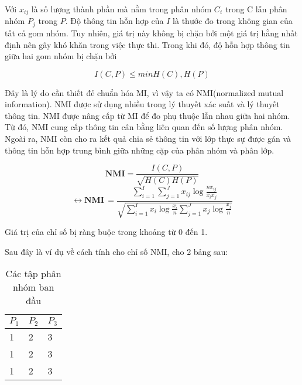 Với $x_{ij}$ là số lượng thành phần mà nằm trong phân nhóm $C_i$ trong C lẫn phân nhóm $P_j$ trong $P$.
Độ thông tin hỗn hợp của $I$ là thước đo trong không gian của tất cả gom nhóm.
Tuy nhiên, giá trị này không bị chặn bởi một giá trị hằng nhất định nên gây khó khăn trong việc thực thi. Trong khi đó, độ hỗn hợp thông tin giữa hai gom nhóm bị chặn bởi 
\begin{center}
\begin{equation}
I (C, P) \leq min{H(C), H(P)}
\end{equation}
\end{center}

Đây là lý do cần thiết đẻ chuẩn hóa MI, vì vậy ta có NMI(normalized mutual information).
NMI được sử dụng nhiều trong lý thuyết xác suất và lý thuyết thông tin.
NMI được nâng cấp từ MI để đo phụ thuộc lẫn nhau giữa hai nhóm.
Từ đó, NMI cung cấp thông tin cân bằng liên quan đến số lượng phân nhóm.
Ngoài ra, NMI còn cho ra kết quả chia sẻ thông tin với lớp thực sự được gán và thông tin hỗn hợp trung bình giữa những cặp của phân nhóm và phân lớp.
		
\begin{center}
\begin{equation}
\textbf{NMI} = \frac{I(C,P)}{\sqrt{H(C)H(P)}}
\end{equation}
\begin{equation} \label{eq:NMI}
\longleftrightarrow \textbf{NMI} \, = \frac{\sum^I_{i=1} \sum^J_{j=1} x_{ij} \log \frac{n x_{ij}}{x_i x_j}}{\sqrt{\sum^I_{i=1} x_i \log \frac{x_i}{n} \sum^J_{j=1} x_j \log \frac{x_j}{n}}}
\end{equation}
\end{center}

Giá trị của chỉ số bị ràng buộc trong khoảng từ 0 đến 1.

Sau đây là ví dụ về cách tính cho chỉ số NMI, cho 2 bảng sau:
\begin{table}[ht]
\begin{center}
\begin{tabularx}{\textwidth}{|Y|Y|Y|}
\hline
$P_1$ & $P_2$ & $P_3$ \\
 & 2 & 3\\

1 & 2 & 3\\

1 & 2 & 3\\
\hline
\end{tabularx}
\caption[Các tập phân nhóm ban đầu]{Các tập phân nhóm ban đầu}
\label{bang_4_3}
\end{center}
\end{table}

